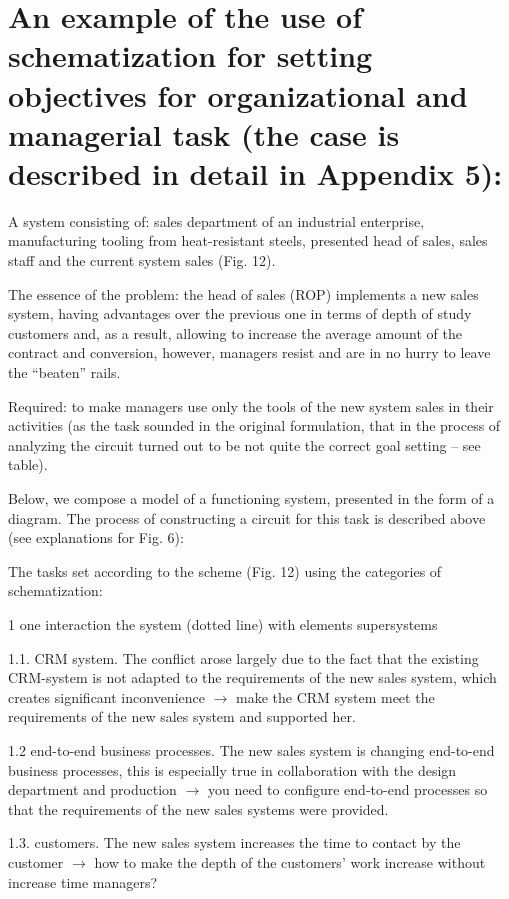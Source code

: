 \section{An example of the use of schematization for setting objectives for
organizational and managerial task (the case is described in detail in
Appendix 5):}

A system consisting of: sales department of an industrial enterprise,
manufacturing tooling from heat-resistant steels, presented head of sales,
sales staff and the current system sales (Fig. 12).

The essence of the problem: the head of sales (ROP) implements a new sales
system, having advantages over the previous one in terms of depth of study
customers and, as a result, allowing to increase the average amount of the
contract and conversion, however, managers resist and are in no hurry to leave
the “beaten” rails. 

Required: to make managers use only the tools of the new system sales in their
activities (as the task sounded in the original formulation, that in the
process of analyzing the circuit turned out to be not quite the correct goal
setting -- see table).

Below, we compose a model of a functioning system, presented in the form of a
diagram.  The process of constructing a circuit for this task is described
above (see explanations for Fig. 6):


The tasks set according to the scheme (Fig. 12) using the categories of
schematization:

1 one interaction the system (dotted line) with elements supersystems

1.1.  CRM system. The conflict arose largely due to the fact that the existing
CRM-system is not adapted to the requirements of the new sales system, which
creates significant inconvenience $\to$ make the CRM system meet the
requirements of the new sales system and supported her.

1.2 end-to-end business processes. The new sales system is changing end-to-end
business processes, this is especially true in collaboration with the design
department and production $\to$ you need to configure end-to-end processes so that
the requirements of the new sales systems were provided.

1.3.  customers. The new sales system increases the time to contact by the
customer $\to$ how to make the depth of the customers' work increase without
increase time managers?

